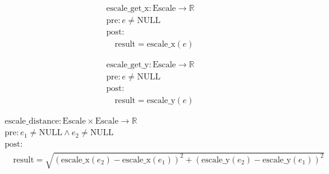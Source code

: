 \[
\begin{aligned}
&\text{escale\_get\_x}: \text{Escale} \to \mathbb{R} \\
&\text{pre}: e \neq \text{NULL} \\
&\text{post}: \\
&\quad \text{result} = \text{escale\_x}(e)
\end{aligned}
\]





\[
\begin{aligned}
&\text{escale\_get\_y}: \text{Escale} \to \mathbb{R} \\
&\text{pre}: e \neq \text{NULL} \\
&\text{post}: \\
&\quad \text{result} = \text{escale\_y}(e)
\end{aligned}
\]



\[
\begin{aligned}
&\text{escale\_distance}: \text{Escale} \times \text{Escale} \to \mathbb{R} \\
&\text{pre}: e_1 \neq \text{NULL} \land e_2 \neq \text{NULL} \\
&\text{post}: \\
&\quad \text{result} = \sqrt{(\text{escale\_x}(e_2) - \text{escale\_x}(e_1))^2 + (\text{escale\_y}(e_2) - \text{escale\_y}(e_1))^2}
\end{aligned}
\]



